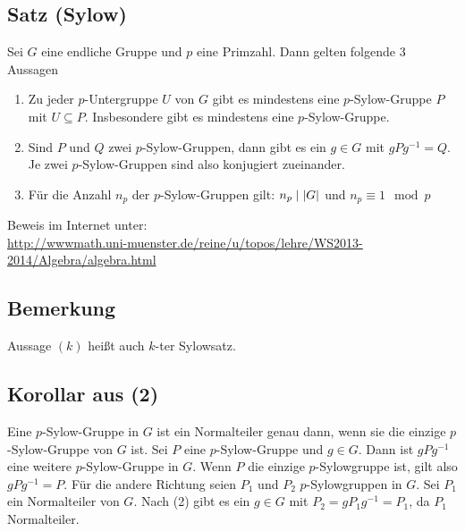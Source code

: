 \subsection{Satz (Sylow)} %
\label{sub:44}
Sei $G$ eine endliche Gruppe und $p$ eine Primzahl. Dann gelten folgende 3 Aussagen
\begin{enumerate}[(1)]
	\item Zu jeder $p$-Untergruppe $U$ von $G$ gibt es mindestens eine $p$-Sylow-Gruppe $P$ mit $U \subseteq P$. Insbesondere gibt es mindestens eine $p$-Sylow-Gruppe.
	\item Sind $P$ und $Q$ zwei $p$-Sylow-Gruppen, dann gibt es ein $g \in G$ mit $g P g ^{-1} =Q$. Je zwei $p$-Sylow-Gruppen sind also konjugiert zueinander.
	\item Für die Anzahl $n_p$ der $p$-Sylow-Gruppen gilt: $n_p \mid \abs*{G} $ und $n_p \equiv 1 \mod p$
\end{enumerate}
Beweis im Internet unter: \\ \url{http://wwwmath.uni-muenster.de/reine/u/topos/lehre/WS2013-2014/Algebra/algebra.html}

\subsection[Bemerkung zur Bezeichnung der Sylow-Sätze]{Bemerkung} %
\label{sub:45}
Aussage $(k)$ heißt auch $k$-ter Sylowsatz.

\subsection[Korollar: Eine $p$-Sylowgruppen ist Normalteiler gdw. sie die einzige $p$-Sylowgruppe ist]{Korollar aus (2)} %
\label{sub:46}
Eine $p$-Sylow-Gruppe in $G$ ist ein Normalteiler genau dann, wenn sie die einzige $p$-Sylow-Gruppe von $G$ ist.
Sei $P$ eine $p$-Sylow-Gruppe und $g \in G$. Dann ist $g P g ^{-1}$ eine weitere $p$-Sylow-Gruppe in $G$. Wenn $P$ die einzige $p$-Sylowgruppe ist, gilt also $gP g ^{-1}=P$.
Für die andere Richtung seien $P_1$ und $P_2$ $p$-Sylowgruppen in $G$. Sei $P_1$ ein Normalteiler von $G$. Nach (2) gibt es ein $g \in G$ mit $P_2 = g P_1 g ^{-1} = P_1$, 
da $P_1$ Normalteiler. \bewende 


